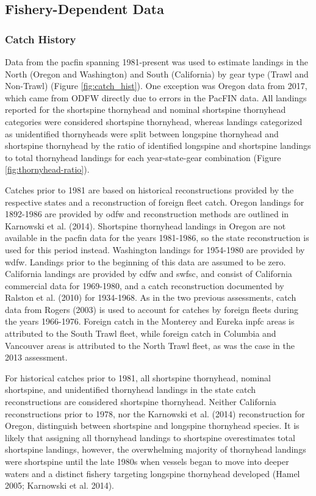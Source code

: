 \documentclass[11pt,
  english,
  letterpaper,
]{article}
\begin{document}
\hypertarget{fishery-dependent-data}{%
\subsection{Fishery-Dependent Data}\label{fishery-dependent-data}}

\hypertarget{catch-history}{%
\subsubsection{Catch History}\label{catch-history}}

Data from the \Gls{pacfin} spanning 1981-present was used to estimate landings in the North (Oregon and Washington) and South (California) by gear type (Trawl and Non-Trawl) (Figure \ref{fig:catch_hist}). One exception was Oregon data from 2017, which came from ODFW directly due to errors in the PacFIN data. All landings reported for the shortspine thornyhead and nominal shortspine thornyhead categories were considered shortspine thornyhead, whereas landings categorized as unidentified thornyheads were split between longspine thornyhead and shortspine thornyhead by the ratio of identified longspine and shortspine landings to total thornyhead landings for each year-state-gear combination (Figure \ref{fig:thornyhead-ratio}).

Catches prior to 1981 are based on historical reconstructions provided by the respective states and a reconstruction of foreign fleet catch. Oregon landings for 1892-1986 are provided by \gls{odfw} and reconstruction methods are outlined in Karnowski et al. (2014). Shortspine thornyhead landings in Oregon are not available in the \gls{pacfin} data for the years 1981-1986, so the state reconstruction is used for this period instead. Washington landings for 1954-1980 are provided by \gls{wdfw}. Landings prior to the beginning of this data are assumed to be zero. California landings are provided by \gls{cdfw} and \gls{swfsc}, and consist of California commercial data for 1969-1980, and a catch reconstruction documented by Ralston et al. (2010) for 1934-1968. As in the two previous assessments, catch data from Rogers (2003) is used to account for catches by foreign fleets during the years 1966-1976. Foreign catch in the Monterey and Eureka \gls{inpfc} areas is attributed to the South Trawl fleet, while foreign catch in Columbia and Vancouver areas is attributed to the North Trawl fleet, as was the case in the 2013 assessment.

For historical catches prior to 1981, all shortspine thornyhead, nominal shortspine, and unidentified thornyhead landings in the state catch reconstructions are considered shortspine thornyhead. Neither California reconstructions prior to 1978, nor the Karnowski et al. (2014) reconstruction for Oregon, distinguish between shortspine and longspine thornyhead species. It is likely that assigning all thornyhead landings to shortspine overestimates total shortspine landings, however, the overwhelming majority of thornyhead landings were shortspine until the late 1980s when vessels began to move into deeper waters and a distinct fishery targeting longspine thornyhead developed (Hamel 2005; Karnowski et al. 2014).
\end{document}

